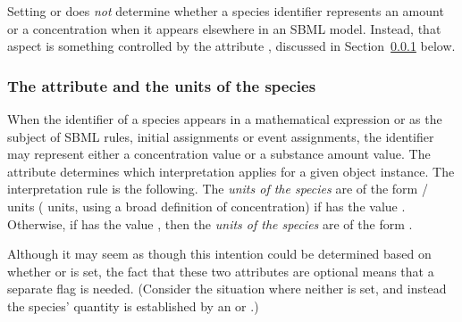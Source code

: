 Setting  or  does
\emph{not} determine whether a species identifier represents an
amount or a concentration when it appears elsewhere in an SBML
model.  Instead, that aspect is something controlled by the
attribute , discussed in
Section~\ref{sec:species-units} below.



\subsubsection{The  attribute and the
  units of the species}
\label{sec:species-units}

When the identifier of a species appears in a mathematical
expression or as the subject of SBML rules, initial assignments or
event assignments, the identifier may represent either a
concentration value or a substance amount value.  The
 attribute 
determines which interpretation applies for a given \Species
object instance.  The interpretation rule is the following.  The
\emph{units of the species} are of the form
/ units (\ie
{} units, using a broad definition of
concentration) if  has the value
.  Otherwise, if  has the
value , then the \emph{units of the species} are of the
form .

Although it may seem as though this intention could be determined
based on whether  or
 is set, the fact that these two \Species
attributes are optional means that a separate flag is needed.
(Consider the situation where neither is set, and instead the
species' quantity is established by an \InitialAssignment or
\AssignmentRule.)

%

